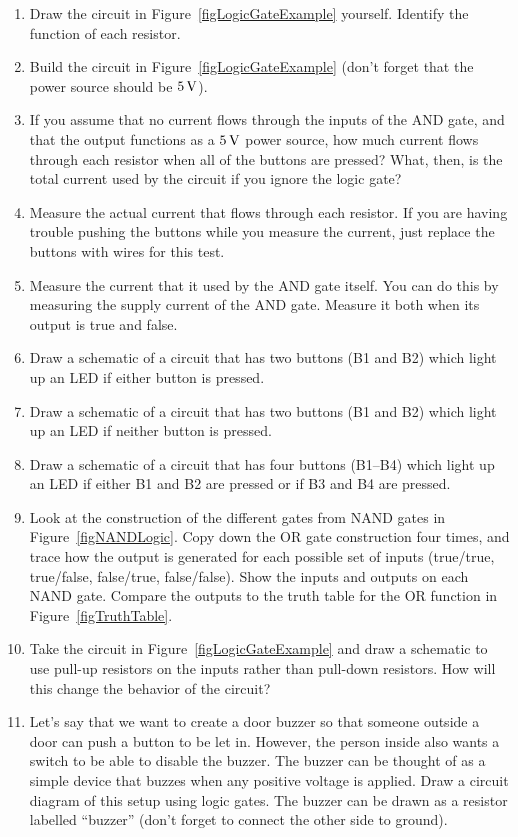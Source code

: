 
\begin{enumerate}
\item Draw the circuit in Figure~\ref{figLogicGateExample} yourself.  Identify the function of each resistor.
\item Build the circuit in Figure~\ref{figLogicGateExample} (don't forget that the power source should be $5\,\si{\volt}$).
\item If you assume that no current flows through the inputs of the AND gate, and that the output functions as a $5\,\si{\volt}$ power source, how much current flows through each resistor when all of the buttons are pressed?  What, then, is the total current used by the circuit if you ignore the logic gate?
\item Measure the actual current that flows through each resistor.  If you are having trouble pushing the buttons while you measure the current, just replace the buttons with wires for this test.
\item Measure the current that it used by the AND gate itself.  You can do this by measuring the supply current of the AND gate.  Measure it both when its output is true and false.
\item Draw a schematic of a circuit that has two buttons (B1 and B2) which light up an LED if either button is pressed.
\item Draw a schematic of a circuit that has two buttons (B1 and B2) which light up an LED if neither button is pressed.
\item Draw a schematic of a circuit that has four buttons (B1--B4) which light up an LED if either B1 and B2 are pressed or if B3 and B4 are pressed.
\item Look at the construction of the different gates from NAND gates in Figure~\ref{figNANDLogic}.  Copy down the OR gate construction four times, and trace how the output is generated for each possible set of inputs (true/true, true/false, false/true, false/false).  Show the inputs and outputs on each NAND gate.  Compare the outputs to the truth table for the OR function in Figure~\ref{figTruthTable}.
\item Take the circuit in Figure~\ref{figLogicGateExample} and draw a schematic to use pull-up resistors on the inputs rather than pull-down resistors.  How will this change the behavior of the circuit?
\item Let's say that we want to create a door buzzer so that someone outside a door can push a button to be let in.  However, the person inside also wants a switch to be able to disable the buzzer.  The buzzer can be thought of as a simple device that buzzes when any positive voltage is applied.  Draw a circuit diagram of this setup using logic gates.  The buzzer can be drawn as a resistor labelled ``buzzer'' (don't forget to connect the other side to ground).
\end{enumerate}
